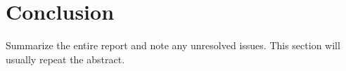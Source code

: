\section{Conclusion}\label{sec:conclusion}
Summarize the entire report and note any unresolved issues.
This section will usually repeat the abstract.
